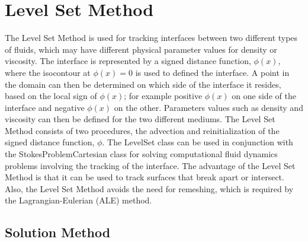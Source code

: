 
%
%
%

\section{Level Set Method}

The Level Set Method is used for tracking interfaces between two different types of fluids, which may have different physical parameter values for density or viscosity. The interface is represented by a signed distance function, $\phi(x)$, where the isocontour at $\phi(x)=0$ is used to defined the interface. A point in the domain can then be determined on which side of the interface it resides, based on the local sign of $\phi(x)$; for example positive $\phi(x)$ on one side of the interface and negative $\phi(x)$ on the other. Parameters values such as density and viscosity can then be defined for the two different mediums. The Level Set Method consists of two procedures, the advection and reinitialization of the signed distance function, $\phi$. The LevelSet class can be used in conjunction with the StokesProblemCartesian class for solving computational fluid dynamics problems involving the tracking of the interface. The advantage of the Level Set Method is that it can be used to track surfaces that break apart or intersect. Also, the Level Set Method avoids the need for remeshing, which is required by the Lagrangian-Eulerian (ALE) method. 


\subsection{Solution Method}

